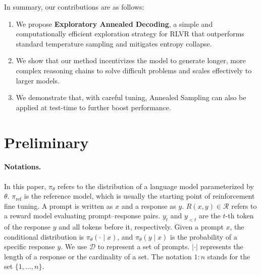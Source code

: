 \documentclass{article} %
\newcommand{\circone}{\ding{172}\xspace}
\newcommand{\circtwo}{\ding{173}\xspace}
\newcommand{\circthree}{\ding{174}\xspace}
\newcommand{\algname}{Exploratory Annealed Decoding\xspace}
\begin{document}
In summary, our contributions are as follows:
\begin{enumerate}[wide, labelwidth=!, labelindent=0pt]
    \item[\circone] We propose \textbf{\algname}, a simple and computationally efficient exploration strategy for RLVR that outperforms standard temperature sampling and mitigates entropy collapse.
    \item[\circtwo] We show that our method incentivizes the model to generate longer, more complex reasoning chains to solve difficult problems and scales effectively to larger models.
    \item[\circthree] We demonstrate that, with careful tuning, Annealed Sampling can also be applied at test-time to further boost performance.
\end{enumerate}



\section{Preliminary}
\paragraph{Notations.} In this paper, $\pi_\theta$ refers to the distribution of a language model parameterized by $\theta$. $\pi_{\mathrm{ref}}$ is the reference model, which is usually the starting point of reinforcement fine tuning. A prompt is written as $x$ and a response as $y$. $R(x, y) \in \mathcal{R}$ refers to a reward model evaluating prompt–response pairs. 
$y_t$ and $y_{<t}$ are the $t$-th token of the response $y$ and all tokens before it, respectively. Given a prompt $x$, the conditional distribution is $\pi_\theta(\cdot \mid x)$, and $\pi_\theta(y \mid x)$ is the probability of a specific response $y$. We use $\mathcal{D}$ to represent a set of prompts. $|\cdot|$ represents the length of a response or the cardinality of a set. The notation $1:n$ stands for the set $\{1, \dots, n\}$.
\end{document}
